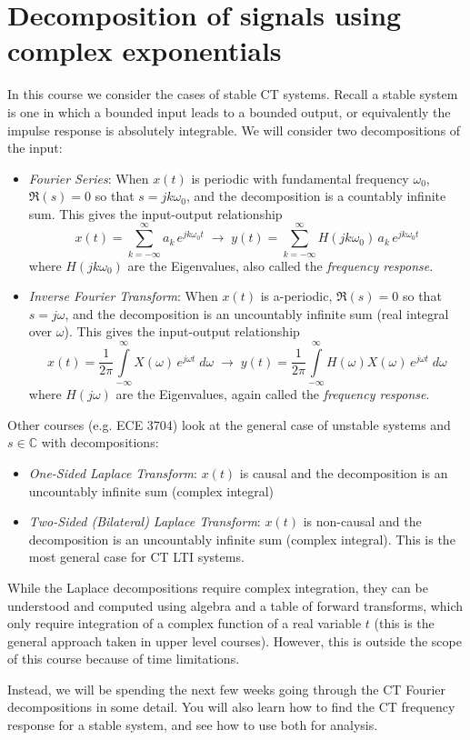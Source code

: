 \section{Decomposition of signals using complex exponentials}

In this course we consider the cases of stable CT systems. Recall a stable system is one in which a bounded input leads to a bounded output, or equivalently the impulse response is absolutely integrable. We will consider two decompositions of the input:

  \begin{itemize}
  \item \emph{Fourier Series}: When $x(t)$ is periodic with fundamental frequency $\omega_0$, $\Re{(s)} = 0$ so that $s = jk\omega_0$, and the decomposition is a countably infinite sum. This gives the input-output relationship
    \[
    x(t) = \sum\limits_{k = -\infty}^{\infty} a_k \, e^{j k\omega_0 t} \; \longrightarrow\; y(t) = \sum\limits_{k = -\infty}^{\infty} H(j k\omega_0)\, a_k \, e^{j k\omega_0 t}
    \]
    where $H(j k\omega_0)$ are the Eigenvalues, also called the \emph{frequency response}.
  \item \emph{Inverse Fourier Transform}: When $x(t)$ is a-periodic, $\Re{(s)} = 0$ so that $s = j\omega$, and the decomposition is an uncountably infinite sum (real integral over $\omega$). This gives the input-output relationship
    \[
    x(t) = \frac{1}{2\pi}\int\limits_{-\infty}^{\infty} X(\omega) \, e^{j \omega t}\; d\omega \;\longrightarrow\; y(t) = \frac{1}{2\pi}\int\limits_{-\infty}^{\infty} H(\omega) X(\omega) \, e^{j \omega t}\; d\omega
    \]
    where $H(j \omega)$ are the Eigenvalues, again called the \emph{frequency response}.  
  \end{itemize}

  Other courses (e.g. ECE 3704) look at the general case of unstable systems and $s \in \mathbb{C}$ with decompositions:

  \begin{itemize}
  \item \emph{One-Sided Laplace Transform}: $x(t)$ is causal and the decomposition is an uncountably infinite sum (complex integral)
  \item \emph{Two-Sided (Bilateral) Laplace Transform}: $x(t)$ is non-causal and the decomposition is an uncountably infinite sum (complex integral). This is the most general case for CT LTI systems.
  \end{itemize}

  While the Laplace decompositions require complex integration, they can be understood and computed using algebra and a table of forward transforms, which only require integration of a complex function of a real variable $t$ (this is the general approach taken in upper level courses). However, this is outside the scope of this course because of time limitations.

Instead, we will be spending the next few weeks going through the CT Fourier decompositions in some detail. You will also learn how to find the CT frequency response for a stable system, and see how to use both for analysis.

